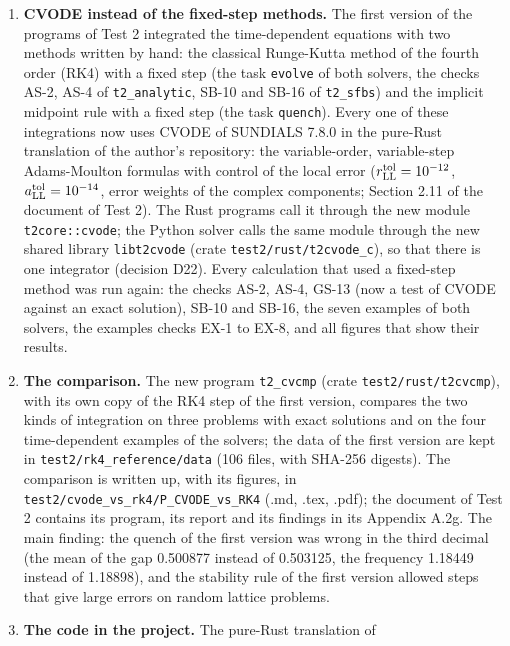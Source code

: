 \documentclass[
  10pt,
]{article}
\providecommand{\tightlist}{%
  \setlength{\itemsep}{0pt}\setlength{\parskip}{0pt}}
\begin{document}
\begin{enumerate}
\def\labelenumi{\arabic{enumi}.}
\tightlist
\item
  \textbf{CVODE instead of the fixed-step methods.} The first version of
  the programs of Test 2 integrated the time-dependent equations with
  two methods written by hand: the classical Runge-Kutta method of the
  fourth order (RK4) with a fixed step (the task \texttt{evolve} of both
  solvers, the checks AS-2, AS-4 of \texttt{t2\_analytic}, SB-10 and
  SB-16 of \texttt{t2\_sfbs}) and the implicit midpoint rule with a
  fixed step (the task \texttt{quench}). Every one of these integrations
  now uses CVODE of SUNDIALS 7.8.0 in the pure-Rust translation of the
  author's repository: the variable-order, variable-step Adams-Moulton
  formulas with control of the local error
  (\(r^{\rm tol}_{\rm LL}=10^{-12}\), \(a^{\rm tol}_{\rm LL}=10^{-14}\),
  error weights of the complex components; Section 2.11 of the document
  of Test 2). The Rust programs call it through the new module
  \texttt{t2core::cvode}; the Python solver calls the same module
  through the new shared library \texttt{libt2cvode} (crate
  \texttt{test2/rust/t2cvode\_c}), so that there is one integrator
  (decision D22). Every calculation that used a fixed-step method was
  run again: the checks AS-2, AS-4, GS-13 (now a test of CVODE against
  an exact solution), SB-10 and SB-16, the seven examples of both
  solvers, the examples checks EX-1 to EX-8, and all figures that show
  their results.
\item
  \textbf{The comparison.} The new program \texttt{t2\_cvcmp} (crate
  \texttt{test2/rust/t2cvcmp}), with its own copy of the RK4 step of the
  first version, compares the two kinds of integration on three problems
  with exact solutions and on the four time-dependent examples of the
  solvers; the data of the first version are kept in
  \texttt{test2/rk4\_reference/data} (106 files, with SHA-256 digests).
  The comparison is written up, with its figures, in
  \texttt{test2/cvode\_vs\_rk4/P\_CVODE\_vs\_RK4} (.md, .tex, .pdf); the
  document of Test 2 contains its program, its report and its findings
  in its Appendix A.2g. The main finding: the quench of the first
  version was wrong in the third decimal (the mean of the gap 0.500877
  instead of 0.503125, the frequency 1.18449 instead of 1.18898), and
  the stability rule of the first version allowed steps that give large
  errors on random lattice problems.
\item
  \textbf{The code in the project.} The pure-Rust translation of

\end{enumerate}
\end{document}
